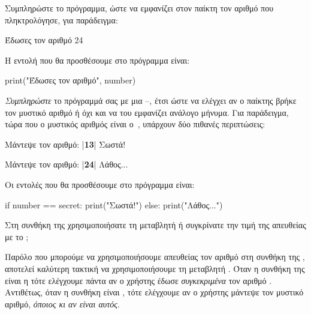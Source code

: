 \documentclass[a4paper,11pt,oneside]{book}
\begin{document}
\begin{step}
Συμπληρώστε το πρόγραμμα, ώστε να εμφανίζει στον παίκτη τον αριθμό που πληκτρολόγησε, για παράδειγμα:

\marginnote[16pt]{\iconcomputer}
\begin{pyterm}
Έδωσες τον αριθμό 24
\end{pyterm}

\begin{answer}
Η εντολή που θα προσθέσουμε στο πρόγραμμα είναι:
	
\begin{pynew}
print("Έδωσες τον αριθμό", number)
\end{pynew}
\end{answer}
\end{step}

\begin{step}
\emph{Συμπληρώστε} το πρόγραμμά σας με μια --, έτσι ώστε να ελέγχει αν ο παίκτης βρήκε τον μυστικό αριθμό ή όχι και να του εμφανίζει ανάλογο μήνυμα. Για παράδειγμα, τώρα που ο μυστικός αριθμός είναι ο~, υπάρχουν δύο πιθανές περιπτώσεις:

\begin{pyterm}
Μάντεψε τον αριθμό:
|\textbf{13}|
Σωστά!
\end{pyterm}

\begin{pyterm}
Μάντεψε τον αριθμό:
|\textbf{24}|
Λάθος...
\end{pyterm}

\begin{answer}
Οι εντολές που θα προσθέσουμε στο πρόγραμμα είναι:

\begin{pynew}
if number == secret:
    print("Σωστά!")
else:
    print("Λάθος...")
\end{pynew}
\end{answer}

Στη συνθήκη της  χρησιμοποιήσατε τη μεταβλητή  ή συγκρίνατε την τιμή της  απευθείας με το ;

\begin{answer}
Παρόλο που μπορούμε να χρησιμοποιήσουμε απευθείας τον αριθμό  στη συνθήκη της , αποτελεί καλύτερη τακτική να χρησιμοποιήσουμε τη μεταβλητή . Όταν η συνθήκη της  είναι η  τότε ελέγχουμε πάντα αν ο χρήστης έδωσε \emph{συγκεκριμένα} τον αριθμό . Αντιθέτως, όταν η συνθήκη είναι , τότε ελέγχουμε αν ο χρήστης μάντεψε τον μυστικό αριθμό, \emph{όποιος κι αν είναι αυτός}.
\end{answer}


\end{step}
\end{document}
